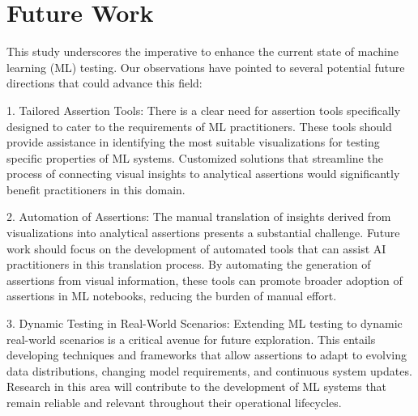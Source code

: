 \documentclass[conference]{IEEEtran}
\begin{document}
\section{Future Work}\label{sec:fw}

This study underscores the imperative to enhance the current state of machine learning (ML) testing. Our observations have pointed to several potential future directions that could advance this field:

1. Tailored Assertion Tools: There is a clear need for assertion tools specifically designed to cater to the requirements of ML practitioners. These tools should provide assistance in identifying the most suitable visualizations for testing specific properties of ML systems. Customized solutions that streamline the process of connecting visual insights to analytical assertions would significantly benefit practitioners in this domain.

2. Automation of Assertions: The manual translation of insights derived from visualizations into analytical assertions presents a substantial challenge. Future work should focus on the development of automated tools that can assist AI practitioners in this translation process. By automating the generation of assertions from visual information, these tools can promote broader adoption of assertions in ML notebooks, reducing the burden of manual effort.

3. Dynamic Testing in Real-World Scenarios: Extending ML testing to dynamic real-world scenarios is a critical avenue for future exploration. This entails developing techniques and frameworks that allow assertions to adapt to evolving data distributions, changing model requirements, and continuous system updates. Research in this area will contribute to the development of ML systems that remain reliable and relevant throughout their operational lifecycles.




\end{document}
